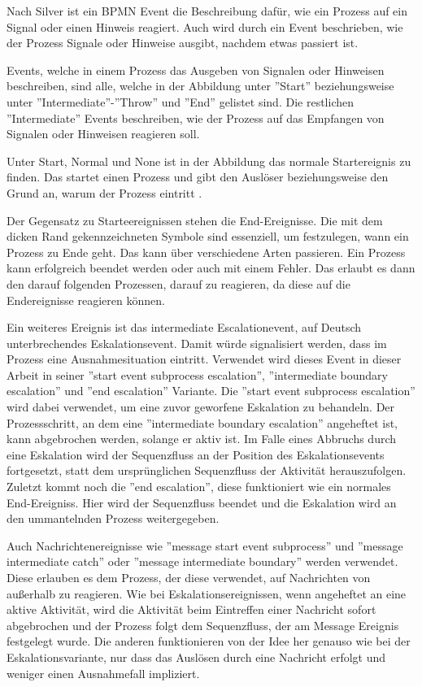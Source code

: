 Nach Silver ist ein \ac{BPMN} Event die Beschreibung dafür, wie ein Prozess auf ein Signal oder einen Hinweis reagiert. Auch wird durch ein Event beschrieben, wie der Prozess Signale oder Hinweise ausgibt, nachdem etwas passiert ist. \citep[vgl.][S. 103]{bruce_bpmn_2012}

Events, welche in einem Prozess das Ausgeben von Signalen oder Hinweisen beschreiben, sind alle, welche in der Abbildung unter ''Start'' beziehungsweise unter ''Intermediate''-''Throw'' und ''End'' gelistet sind. Die restlichen ''Intermediate'' Events beschreiben, wie der Prozess auf das Empfangen von Signalen oder Hinweisen reagieren soll.

Unter Start, Normal und None ist in der Abbildung das normale Startereignis zu finden. Das startet einen Prozess und gibt den Auslöser beziehungsweise den Grund an, warum der Prozess eintritt \citep[vgl.][S. 49]{bruce_bpmn_2012}.

Der Gegensatz zu Starteereignissen stehen die End-Ereignisse. Die mit dem dicken Rand gekennzeichneten Symbole sind essenziell, um festzulegen, wann ein Prozess zu Ende geht. Das kann über verschiedene Arten passieren. Ein Prozess kann erfolgreich beendet werden oder auch mit einem Fehler. Das erlaubt es dann den darauf folgenden Prozessen, darauf zu reagieren, da diese auf die Endereignisse reagieren können. \citep[vgl.][S. 55f]{bruce_englisch_2011}

Ein weiteres Ereignis ist das intermediate Escalationevent, auf Deutsch unterbrechendes Eskalationsevent. Damit würde signalisiert werden, dass im Prozess eine Ausnahmesituation eintritt. Verwendet wird dieses Event in dieser Arbeit in seiner ''start event subprocess escalation'', ''intermediate boundary escalation'' und ''end escalation'' Variante. Die ''start event subprocess escalation'' wird dabei verwendet, um eine zuvor geworfene Eskalation zu behandeln. Der Prozessschritt, an dem eine ''intermediate boundary escalation'' angeheftet ist, kann abgebrochen werden, solange er aktiv ist. Im Falle eines Abbruchs durch eine Eskalation wird der Sequenzfluss an der Position des Eskalationsevents fortgesetzt, statt dem ursprünglichen Sequenzfluss der Aktivität herauszufolgen. Zuletzt kommt noch die ''end escalation'', diese funktioniert wie ein normales End-Ereigniss. Hier wird der Sequenzfluss beendet und die Eskalation wird an den ummantelnden Prozess weitergegeben. \citep[vgl.][S. 107, 111f]{bruce_englisch_2011}

Auch Nachrichtenereignisse wie ''message start event subprocess'' und ''message intermediate catch'' oder ''message intermediate boundary'' werden verwendet. Diese erlauben es dem Prozess, der diese verwendet, auf Nachrichten von außerhalb zu reagieren. Wie bei Eskalationsereignissen, wenn angeheftet an eine aktive Aktivität, wird die Aktivität beim Eintreffen einer Nachricht sofort abgebrochen und der Prozess folgt dem Sequenzfluss, der am Message Ereignis festgelegt wurde. Die anderen funktionieren von der Idee her genauso wie bei der Eskalationsvariante, nur dass das Auslösen durch eine Nachricht erfolgt und weniger einen Ausnahmefall impliziert. \citep[vgl.][S. 99f, 102]{bruce_englisch_2011}

